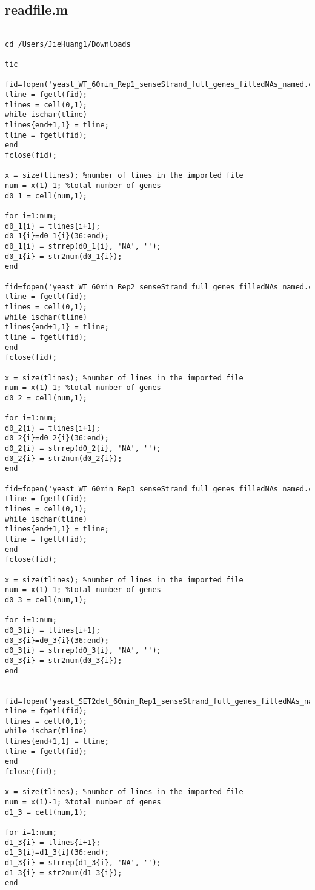 \documentclass{article}
\begin{document}
\subsection{readfile.m} \label{readfile}
\begin{lstlisting}[frame=single]
%read in all gene sequences and convert them to arrays

cd /Users/JieHuang1/Downloads

tic

fid=fopen('yeast_WT_60min_Rep1_senseStrand_full_genes_filledNAs_named.coord');
tline = fgetl(fid);
tlines = cell(0,1);
while ischar(tline)
tlines{end+1,1} = tline;
tline = fgetl(fid);
end
fclose(fid);

x = size(tlines); %number of lines in the imported file
num = x(1)-1; %total number of genes
d0_1 = cell(num,1);

for i=1:num;
d0_1{i} = tlines{i+1};
d0_1{i}=d0_1{i}(36:end);
d0_1{i} = strrep(d0_1{i}, 'NA', '');
d0_1{i} = str2num(d0_1{i});
end

fid=fopen('yeast_WT_60min_Rep2_senseStrand_full_genes_filledNAs_named.coord');
tline = fgetl(fid);
tlines = cell(0,1);
while ischar(tline)
tlines{end+1,1} = tline;
tline = fgetl(fid);
end
fclose(fid);

x = size(tlines); %number of lines in the imported file
num = x(1)-1; %total number of genes
d0_2 = cell(num,1);

for i=1:num;
d0_2{i} = tlines{i+1};
d0_2{i}=d0_2{i}(36:end);
d0_2{i} = strrep(d0_2{i}, 'NA', '');
d0_2{i} = str2num(d0_2{i});
end

fid=fopen('yeast_WT_60min_Rep3_senseStrand_full_genes_filledNAs_named.coord');
tline = fgetl(fid);
tlines = cell(0,1);
while ischar(tline)
tlines{end+1,1} = tline;
tline = fgetl(fid);
end
fclose(fid);

x = size(tlines); %number of lines in the imported file
num = x(1)-1; %total number of genes
d0_3 = cell(num,1);

for i=1:num;
d0_3{i} = tlines{i+1};
d0_3{i}=d0_3{i}(36:end);
d0_3{i} = strrep(d0_3{i}, 'NA', '');
d0_3{i} = str2num(d0_3{i});
end


fid=fopen('yeast_SET2del_60min_Rep1_senseStrand_full_genes_filledNAs_named.coord');
tline = fgetl(fid);
tlines = cell(0,1);
while ischar(tline)
tlines{end+1,1} = tline;
tline = fgetl(fid);
end
fclose(fid);

x = size(tlines); %number of lines in the imported file
num = x(1)-1; %total number of genes
d1_3 = cell(num,1);

for i=1:num;
d1_3{i} = tlines{i+1};
d1_3{i}=d1_3{i}(36:end);
d1_3{i} = strrep(d1_3{i}, 'NA', '');
d1_3{i} = str2num(d1_3{i});
end



\end{lstlisting}
\end{document}
